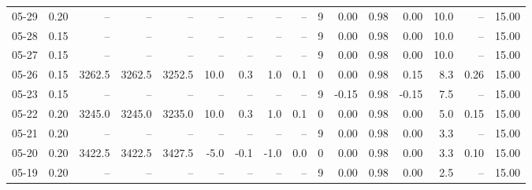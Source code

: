 \begin{threeparttable}
{\begin{tabular}{lrrrrrrrrrrrrrrr}
  05-29 &     0.20 &     -- &     -- &     -- &         -- &             -- &                       -- &                  -- &              9 &       0.00 &      0.98 &           0.00 &             10.0 &              -- &                  15.00 \\
  05-28 &     0.15 &     -- &     -- &     -- &         -- &             -- &                       -- &                  -- &              9 &       0.00 &      0.98 &           0.00 &             10.0 &              -- &                  15.00 \\
  05-27 &     0.15 &     -- &     -- &     -- &         -- &             -- &                       -- &                  -- &              9 &       0.00 &      0.98 &           0.00 &             10.0 &              -- &                  15.00 \\
  05-26 &     0.15 & 3262.5 & 3262.5 & 3252.5 &       10.0 &            0.3 &                      1.0 &                 0.1 &              0 &       0.00 &      0.98 &           0.15 &              8.3 &            0.26 &                  15.00 \\
  05-23 &     0.15 &     -- &     -- &     -- &         -- &             -- &                       -- &                  -- &              9 &      -0.15 &      0.98 &          -0.15 &              7.5 &              -- &                  15.00 \\
  05-22 &     0.20 & 3245.0 & 3245.0 & 3235.0 &       10.0 &            0.3 &                      1.0 &                 0.1 &              0 &       0.00 &      0.98 &           0.00 &              5.0 &            0.15 &                  15.00 \\
  05-21 &     0.20 &     -- &     -- &     -- &         -- &             -- &                       -- &                  -- &              9 &       0.00 &      0.98 &           0.00 &              3.3 &              -- &                  15.00 \\
  05-20 &     0.20 & 3422.5 & 3422.5 & 3427.5 &       -5.0 &           -0.1 &                     -1.0 &                 0.0 &              0 &       0.00 &      0.98 &           0.00 &              3.3 &            0.10 &                  15.00 \\
  05-19 &     0.20 &     -- &     -- &     -- &         -- &             -- &                       -- &                  -- &              9 &       0.00 &      0.98 &           0.00 &              2.5 &              -- &                  15.00 \\

\end{tabular}}
\end{threeparttable}
